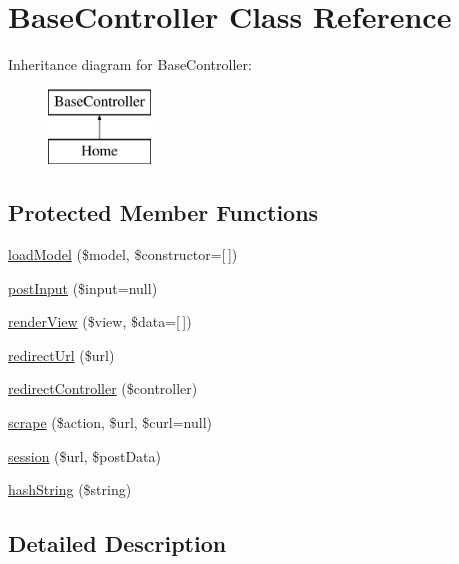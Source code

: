 \hypertarget{class_base_controller}{}\section{Base\+Controller Class Reference}
\label{class_base_controller}
Inheritance diagram for Base\+Controller\+:\begin{figure}[H]
\begin{center}
\leavevmode
\includegraphics[height=2.000000cm]{class_base_controller}
\end{center}
\end{figure}
\subsection*{Protected Member Functions}
\begin{DoxyCompactItemize}
\item 
\hyperlink{class_base_controller_a5fa8890bd3a9d20f5c0cc2377dc49eb1}{load\+Model} (\$model, \$constructor=\mbox{[}$\,$\mbox{]})
\item 
\hyperlink{class_base_controller_a170629218b28c1759a89c4978b9323b3}{post\+Input} (\$input=null)
\item 
\hyperlink{class_base_controller_aa0c49b95cd8e5ff8ff61b4a2c35bf1eb}{render\+View} (\$view, \$data=\mbox{[}$\,$\mbox{]})
\item 
\hyperlink{class_base_controller_a9f95c7503770ed9c974005b363ec3d00}{redirect\+Url} (\$url)
\item 
\hyperlink{class_base_controller_a85ddb683efc64655be063b697f631beb}{redirect\+Controller} (\$controller)
\item 
\hyperlink{class_base_controller_abd4f25604b09a96c254491df97612cc3}{scrape} (\$action, \$url, \$curl=null)
\item 
\hyperlink{class_base_controller_a259a554926fc05640c8c711c340cdeac}{session} (\$url, \$post\+Data)
\item 
\hyperlink{class_base_controller_ac7f37d2e13bade1709f5c88b02f0e9d1}{hash\+String} (\$string)
\end{DoxyCompactItemize}


\subsection{Detailed Description}


